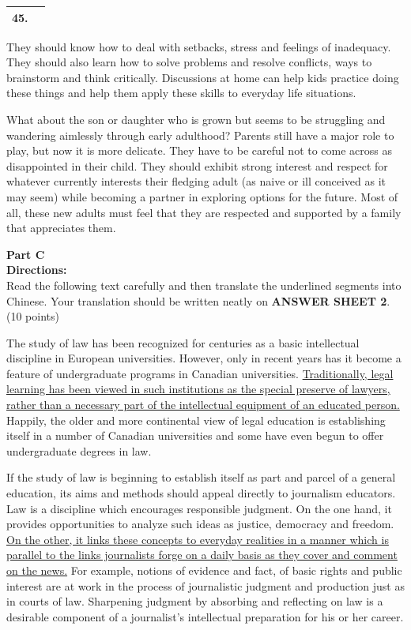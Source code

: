  \begin{tabular}{|c|c|}
	\hline 
	45.  &   \hspace{10em}  \\ 
	\hline 
\end{tabular}


They should know how to deal with setbacks, stress and feelings of
inadequacy. They should also learn how to solve problems and resolve
conflicts, ways to brainstorm and think critically. Discussions at home
can help kids practice doing these things and help them apply these
skills to everyday life situations.

What about the son or daughter who is grown but seems to be struggling
and wandering aimlessly through early adulthood? Parents still have a
major role to play, but now it is more delicate. They have to be careful
not to come across as disappointed in their child. They should exhibit
strong interest and respect for whatever currently interests their
fledging adult (as naive or ill conceived as it may seem) while becoming
a partner in exploring options for the future. Most of all, these new
adults must feel that they are respected and supported by a family that
appreciates them.

\phantom{\linefill.\linefill.\linefill.\linefill.\linefill.}



\noindent
\textbf{Part C}\\
\textbf{Directions:}\\
Read the following text carefully and then translate the
underlined segments into Chinese. Your translation should be written
neatly on \textbf{ANSWER SHEET 2}. (10 points)


The study of law has been recognized for centuries as a basic
intellectual discipline in European universities. However, only in
recent years has it become a feature of undergraduate programs in
Canadian universities. \transnum \uline{Traditionally, legal learning has
been viewed in such institutions as the special preserve of lawyers,
rather than a necessary part of the intellectual equipment of an
educated person.} Happily, the older and more continental view of legal
education is establishing itself in a number of Canadian universities
and some have even begun to offer undergraduate degrees in law.

If the study of law is beginning to establish itself as part and parcel
of a general education, its aims and methods should appeal directly to
journalism educators. Law is a discipline which encourages responsible
judgment. On the one hand, it provides opportunities to analyze such
ideas as justice, democracy and freedom. \transnum \uline{On the other,
it links these concepts to everyday realities in a manner which is
parallel to the links journalists forge on a daily basis as they cover
and comment on the news.} For example, notions of evidence and fact, of
basic rights and public interest are at work in the process of
journalistic judgment and production just as in courts of law.
Sharpening judgment by absorbing and reflecting on law is a desirable
component of a journalist's intellectual preparation for his or her
career.

